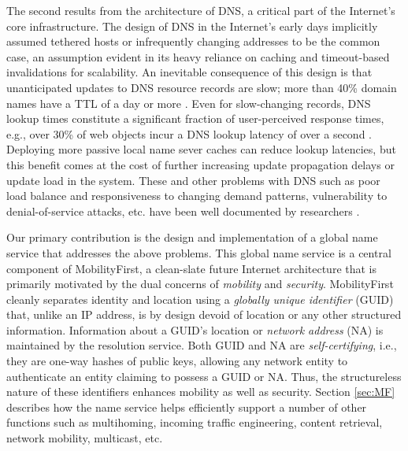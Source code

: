 {The second results from the architecture of DNS, a critical part of the Internet's core infrastructure. The design of DNS in the Internet's early days implicitly assumed tethered hosts or infrequently changing addresses to be the common case, an assumption evident in its heavy reliance on caching and timeout-based invalidations for scalability. An inevitable consequence of this design is that unanticipated updates to DNS resource records are slow; more than 40\% domain names have a TTL of a day or more \cite{codons}. Even for slow-changing records, DNS lookup times constitute a significant fraction of user-perceived response times, e.g., over 30\% of web objects incur a DNS lookup latency of over a second \cite{Jung,Huitema}. Deploying more passive local name sever caches can reduce lookup latencies, but this benefit comes at the cost of further increasing update propagation delays or update load in the system. These and other problems with DNS such as poor load balance and responsiveness to changing demand patterns, vulnerability to denial-of-service attacks, etc. have been well documented by researchers \cite{Pappas,codons,Brownlee,dnssec}.

Our primary contribution is the design and implementation of a global name service that addresses the above problems. This global name service is a central component of MobilityFirst, a clean-slate future Internet architecture that is primarily motivated by the dual concerns of {\em mobility} and {\em security}.
MobilityFirst cleanly separates identity and location using a {\em globally unique identifier} (GUID) that, unlike an IP address, is by design devoid of location or any other structured information. Information about a GUID's location or {\em network address} (NA) is maintained by the resolution service. Both GUID and NA are {\em self-certifying}, i.e., they are one-way hashes of public keys, allowing any network entity to authenticate an entity claiming to possess a GUID or NA. Thus, the structureless nature of these identifiers enhances mobility as well as security. Section \ref{sec:MF} describes how the name service helps efficiently support a number of other functions such as multihoming, incoming traffic engineering, content retrieval, network mobility, multicast, etc.


}
